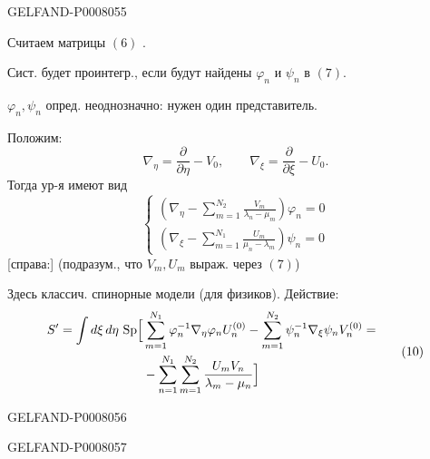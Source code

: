 \begin{GelfandAdjacentEvidence}{GELFAND-P000805}{5}


Считаем матрицы \((6)\) .

Сист. будет проинтегр., если будут найдены \(\varphi_n\) и \(\psi_n\) в \((7)\).

\(\varphi_n,\psi_n\) опред. неоднозначно: нужен один представитель.

Положим:
\begin{equation*}
\nabla_\eta=\frac{\partial}{\partial\eta}-V_0,\qquad
\nabla_\xi=\frac{\partial}{\partial\xi}-U_0.
\tag{8}
\end{equation*}
Тогда ур-я имеют вид
\begin{equation*}
\begin{cases}
\displaystyle\left(\nabla_\eta-\sum_{m=1}^{N_2}\frac{V_m}{\lambda_n-\mu_m}\right)\varphi_n=0\\[1.5ex]
\displaystyle\left(\nabla_\xi-\sum_{m=1}^{N_1}\frac{U_m}{\mu_n-\lambda_m}\right)\psi_n=0
\end{cases}
\tag{9}
\end{equation*}
[справа:] (подразум., что \(V_m,U_m\) выраж. через \((7)\))

Здесь классич. спинорные модели (для физиков). Действие:
\begin{equation*}
\begin{aligned}
S'=\int d\xi\,d\eta\,\operatorname{Sp}\Bigl[
 &\sum_{m=1}^{N_1}\varphi_n^{-1}\nabla_\eta\varphi_n U_n^{(0)}
 -\sum_{m=1}^{N_2}\psi_n^{-1}\nabla_\xi\psi_n V_n^{(0)}=\\
 &-\sum_{n=1}^{N_1}\sum_{m=1}^{N_2}\frac{U_m V_n}{\lambda_m-\mu_n}\Bigr]
\end{aligned}
\tag{10}
\end{equation*}
\end{GelfandAdjacentEvidence}
\begin{GelfandAdjacentEvidence}{GELFAND-P000805}{6}

\end{GelfandAdjacentEvidence}
\begin{GelfandAdjacentEvidence}{GELFAND-P000805}{7}

\end{GelfandAdjacentEvidence}



